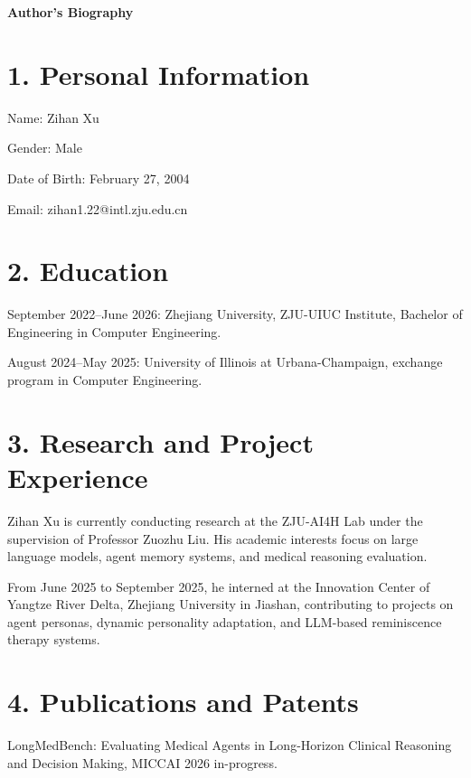 \centerline{\xiaoyi\bf Author's Biography}

\section*{1. Personal Information}

Name: Zihan Xu

Gender: Male

Date of Birth: February 27, 2004

Email: zihan1.22@intl.zju.edu.cn

\section*{2. Education}

September 2022--June 2026: Zhejiang University, ZJU-UIUC Institute, Bachelor of Engineering in Computer Engineering.

August 2024--May 2025: University of Illinois at Urbana-Champaign, exchange program in Computer Engineering.

\section*{3. Research and Project Experience}

Zihan Xu is currently conducting research at the ZJU-AI4H Lab under the supervision of Professor Zuozhu Liu. His academic interests focus on large language models, agent memory systems, and medical reasoning evaluation.

From June 2025 to September 2025, he interned at the Innovation Center of Yangtze River Delta, Zhejiang University in Jiashan, contributing to projects on agent personas, dynamic personality adaptation, and LLM-based reminiscence therapy systems.

\section*{4. Publications and Patents}

LongMedBench: Evaluating Medical Agents in Long-Horizon Clinical Reasoning and Decision Making, MICCAI 2026 in-progress.
